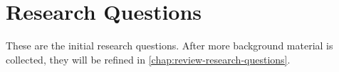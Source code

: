 \section{Research Questions}\label{chap:research-questions}

These are the initial research questions. After more background material is collected, they will be refined in \cref{chap:review-research-questions}.

\begin{questions}[leftmargin=1cm]
  \item \emph{}\label{rq:1}
  \begin{questions}  
    \item \emph{}\label{rq:2}
    \item \emph{}\label{rq:3}
    \item \emph{}\label{rq:4}
  \end{questions}
\end{questions}

